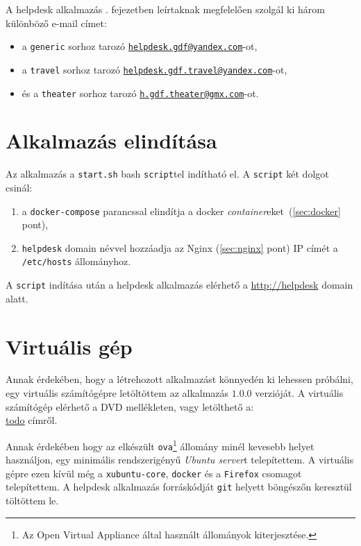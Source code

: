 A helpdesk alkalmazás . fejezetben leírtaknak megfelelően szolgál ki három különböző e-mail címet:

\begin{itemize}
	\item a \texttt{generic} sorhoz tarozó  \href{mailto:helpdesk.gdf@yandex.com}{\nolinkurl{helpdesk.gdf@yandex.com}}-ot, 
	\item a \texttt{travel} sorhoz tarozó  \href{mailto:helpdesk.gdf.travel@yandex.com}{\nolinkurl{helpdesk.gdf.travel@yandex.com}}-ot,
	\item és a \texttt{theater} sorhoz tarozó  \href{mailto:h.gdf.theater@gmx.com}{\nolinkurl{h.gdf.theater@gmx.com}}-ot.
\end{itemize}



\section{Alkalmazás elindítása}\label{sec:elinditas}
Az alkalmazás a \texttt{start.sh} bash \texttt{script}tel indítható el. A \texttt{script} két dolgot csinál:
\begin{enumerate}
	\item a \texttt{docker-compose} parancssal elindítja a docker \emph{container}eket~(\ref{sec:docker} pont),
	\item  \texttt{helpdesk} domain névvel hozzáadja az Nginx (\ref{sec:nginx} pont) IP címét a \mbox{\texttt{/etc/hosts}} állományhoz.
\end{enumerate}

A \texttt{script} indítása után a helpdesk alkalmazás elérhető a \href{http://helpdesk}{http://helpdesk} domain alatt.

\section{Virtuális gép}
Annak érdekében, hogy a létrehozott alkalmazást könnyedén ki lehessen próbálni, egy virtuális számítógépre letöltöttem az alkalmazás $1.0.0$ verzióját. A virtuális számítógép elérhető a DVD mellékleten, vagy letölthető a: \\
\href{http://todo}{todo} címről.

Annak érdekében hogy az elkészült \texttt{ova}\footnote{Az Open Virtual Appliance által használt állományok kiterjesztése.} állomány minél kevesebb helyet használjon, egy minimális rendszerigényű \emph{Ubuntu server}t telepítettem. A virtuális gépre ezen kívül még a \texttt{xubuntu-core}, \texttt{docker} és a \texttt{Firefox} csomagot telepítettem. A helpdesk alkalmazás forráskódját \texttt{git} helyett böngészőn keresztül töltöttem le.


